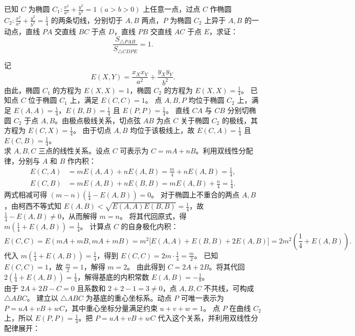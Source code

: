 \begin{example}
已知 \(C\) 为椭圆 \(C_1: \frac{x^2}{a^2} + \frac{y^2}{b^2} = 1\ (a>b>0)\) 上任意一点，过点 \(C\) 作椭圆 \(C_2: \frac{x^2}{a^2} + \frac{y^2}{b^2} = \frac{1}{4}\) 的两条切线，分别切于 \(A,B\) 两点，\(P\) 为椭圆 \(C_2\) 上异于 \(A,B\) 的一动点，直线 \(PA\) 交直线 \(BC\) 于点 \(D\)，直线 \(PB\) 交直线 \(AC\) 于点 \(E\)，求证：
\[
\frac{S_{\triangle PAB}}{S_{\triangle CDPE}} = 1.
\]
\end{example}
\begin{solution}
记
\[ E(X,Y) = \frac{x_X x_Y}{a^2} + \frac{y_X y_Y}{b^2}. \]
由此，椭圆 $C_1$ 的方程为 $E(X,X) = 1$，椭圆 $C_2$ 的方程为 $E(X,X) = \frac{1}{4}$。
已知点 $C$ 位于椭圆 $C_1$ 上，满足 $E(C,C) = 1$。
点 $A,B,P$ 均位于椭圆 $C_2$ 上，满足 $E(A,A) = \frac{1}{4}$，$E(B,B) = \frac{1}{4}$ 且 $E(P,P) = \frac{1}{4}$。
直线 $CA$ 与 $CB$ 分别切椭圆 $C_2$ 于点 $A, B$。由极点极线关系，切点弦 $AB$ 为点 $C$ 关于椭圆 $C_2$ 的极线，其方程为 $E(C,X) = \frac{1}{4}$。
由于切点 $A, B$ 均位于该极线上，故 $E(C,A) = \frac{1}{4}$ 且 $E(C,B) = \frac{1}{4}$。\\
求 $A,B,C$ 三点的线性关系。设点 $C$ 可表示为 $C = m A + n B$。利用双线性分配律，分别与 $A$ 和 $B$ 作内积：
\begin{align*}
E(C, A) &= m E(A, A) + n E(A, B) = \frac{m}{4} + n E(A, B) = \frac{1}{4}, \\
E(C, B) &= m E(A, B) + n E(B, B) = m E(A, B) + \frac{n}{4} = \frac{1}{4}.
\end{align*}
两式相减可得 $(m - n)\left(\frac{1}{4} - E(A, B)\right) = 0$。
对于椭圆上不重合的两点 $A, B$，由柯西不等式知 $E(A, B) < \sqrt{E(A, A)E(B, B)} = \frac{1}{4}$，故 $\frac{1}{4} - E(A, B) \neq 0$，从而解得 $m = n$。
将其代回原式，得 $m \left(\frac{1}{4} + E(A, B)\right) = \frac{1}{4}$。
计算点 $C$ 的自身极化内积：
\[
E(C, C) = E(m A + m B, m A + m B) = m^2 \big[ E(A, A) + E(B, B) + 2E(A, B) \big] = 2m^2 \left(\frac{1}{4} + E(A, B)\right).
\]
代入 $m \left(\frac{1}{4} + E(A, B)\right) = \frac{1}{4}$，得到 $E(C, C) = 2m \cdot \frac{1}{4} = \frac{m}{2}$。
已知 $E(C, C) = 1$，故 $\frac{m}{2} = 1$，解得 $m = 2$。
由此得到 $C = 2A + 2B$。将其代回 $2\left(\frac{1}{4} + E(A, B)\right) = \frac{1}{4}$，解得基底的内积常数 $E(A, B) = -\frac{1}{8}$。\\
由于 $2A+2B-C=0$ 且系数和 $2+2-1=3 \neq 0$，点 $A,B,C$ 不共线，可构成 $\triangle ABC$。
建立以 $\triangle ABC$ 为基底的重心坐标系。动点 $P$ 可唯一表示为 $P = uA + vB + wC$，其中重心坐标分量满足约束 $u+v+w=1$。
点 $P$ 在曲线 $C_2$ 上，所以 $E(P, P) = \frac{1}{4}$。把 $P=uA+vB+wC$ 代入这个关系，并利用双线性分配律展开：

\end{solution}
